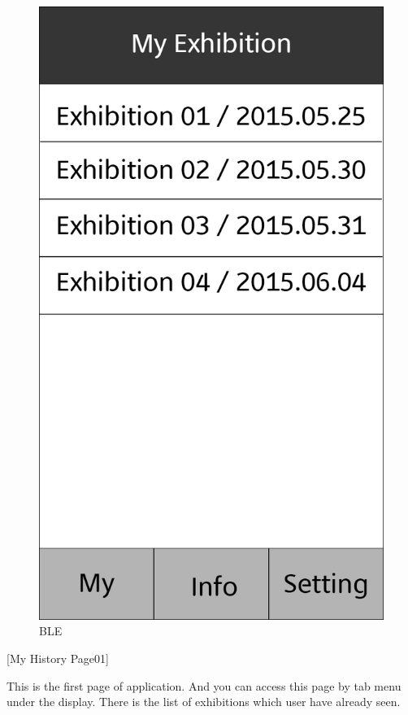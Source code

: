 \documentclass[conference]{IEEEtran}
\begin{document}
\begin{figure}[htbp]
\begin{center}
    \includegraphics[scale=0.2]{img_My01}
    \caption{BLE} 
\end{center}
\end{figure}


[My History Page01]

This is the first page of application. And you can access this page by tab menu under the display. There is the list of exhibitions which user have already seen.  \\
\end{document}
